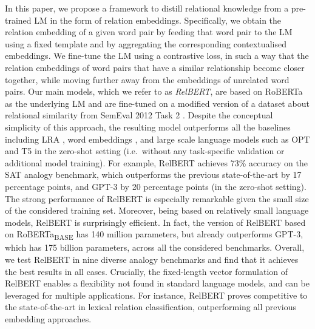\documentclass[3p]{elsarticle}
\begin{document}
{In this paper, we propose a framework to distill relational knowledge from a pre-trained LM in the form of relation embeddings. %
Specifically, we obtain the relation embedding of a given word pair by feeding that word pair to the LM using a fixed template and by aggregating the corresponding contextualised embeddings.
We fine-tune the LM using a contrastive loss, in such a way that the relation embeddings of word pairs that have a similar relationship become closer together, while moving further away from the embeddings of unrelated word pairs. Our main models, which we refer to as \emph{RelBERT}, are based on RoBERTa \cite{RoBERTa} as the underlying LM and are fine-tuned on a modified version of a dataset about relational similarity from SemEval 2012 Task 2 \cite{jurgens-etal-2012-semeval}. %
Despite the conceptual simplicity of this approach, the resulting model outperforms all the baselines including LRA \cite{Turney:2005:MSS:1642293.1642475}, word embeddings \cite{mikolov2013distributed,pennington-etal-2014-glove,bojanowski2016enriching}, and large scale language models such as OPT \cite{zhang2022opt,iyer2022opt} and T5 \cite{2020t5,https://doi.org/10.48550/arxiv.2210.11416} in the zero-shot setting (i.e.\ without any task-specific validation or additional model training). For example, RelBERT achieves 73\% accuracy on the SAT analogy benchmark, which outperforms the previous state-of-the-art by 17 percentage points, and GPT-3 \cite{GPT3} by 20 percentage points (in the zero-shot setting). 
The strong performance of RelBERT is especially remarkable given the small size of the considered training set.
Moreover, being based on relatively small language models, RelBERT is surprisingly efficient. In fact, the version of RelBERT based on RoBERTa\textsubscript{BASE} has 140 million parameters, but already outperforms GPT-3, which has 175 billion parameters, across all the considered benchmarks. Overall, we test RelBERT in nine diverse analogy benchmarks and find that it achieves the best results in all cases. Crucially, the fixed-length vector formulation of RelBERT enables a flexibility not found in standard language models, and can be leveraged for multiple applications. For instance, RelBERT proves competitive to the state-of-the-art in lexical relation classification, outperforming all previous embedding approaches.

}
\end{document}
